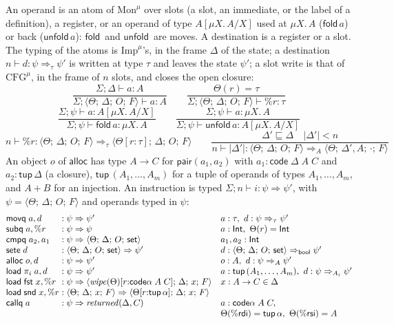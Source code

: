 \documentclass[10pt]{article}
\theoremstyle{acmplain}
\newcommand{\key}[1]{\mathsf{#1}}
\newcommand{\rdi}{\%\key{rdi}}
\newcommand{\rsi}{\%\key{rsi}}
\newcommand{\Tst}[4]{\langle #1;\, #2;\, #3;\, #4 \rangle} %
\newcommand{\tupA}{\key{tup}\,\alpha}                     %
\newcommand{\Treturned}[1]{\mathit{returned}(#1)}
\newcommand{\Twipe}[1]{\mathit{wipe}(#1)}
\newcommand{\Tset}{\key{set}}
\newcommand{\Ml}[1]{\textrm{#1}^{\mu}}                  %
\newcommand{\Mmu}[2]{\mu #1.\,#2}                         %
\newcommand{\Mtup}[1]{\key{tup}\,#1}                      %
\newcommand{\Mcodety}[3]{\key{code}\;#1\;#2\;#3}          %
\newcommand{\Munroll}[2]{#2[\mu #1.\,#2/#1]}              %
\newcommand{\Mbool}{\key{bool}}                           %
\newcommand{\Mfold}{\key{fold}\,}
\newcommand{\Munfold}{\key{unfold}\,}
\newcommand{\codeAB}[2]{\key{code}\alpha\;#1\;#2}         %
\begin{document}
An operand is an atom of $\Ml{Mon}$ over slots (a slot, an immediate, or
the label of a definition), a register, or an operand of type
$\Munroll{X}{A}$ used at $\Mmu{X}{A}$ ($\Mfold a$) or back
($\Munfold a$): $\Mfold$ and $\Munfold$ are moves. A
destination is a register or a slot. The typing of the atoms is
$\Ml{Imp}$'s, in the frame $\Delta$ of the state; a destination
$n \vdash d : \psi \Rightarrow_\tau \psi'$ is written at type $\tau$ and
leaves the state $\psi'$; a slot write is that of $\Ml{CFG}$, in the frame
of $n$ slots, and closes the open closure:
\[
  \frac{\Sigma; \Delta \vdash a : A}{\Sigma; \Tst{\Theta}{\Delta}{O}{F} \vdash a : A}
  \qquad
  \frac{\Theta(r) = \tau}{\Sigma; \Tst{\Theta}{\Delta}{O}{F} \vdash \%r : \tau}
\]
\[
  \frac{\Sigma; \psi \vdash a : \Munroll{X}{A}}{\Sigma; \psi \vdash \Mfold a : \Mmu{X}{A}}
  \qquad
  \frac{\Sigma; \psi \vdash a : \Mmu{X}{A}}{\Sigma; \psi \vdash \Munfold a : \Munroll{X}{A}}
\]
\[
  n \vdash \%r : \Tst{\Theta}{\Delta}{O}{F} \Rightarrow_\tau \Tst{\Theta[r{:}\tau]}{\Delta}{O}{F}
  \qquad
  \frac{\Delta' \sqsubseteq \Delta \quad |\Delta'| < n}
       {n \vdash |\Delta'| : \Tst{\Theta}{\Delta}{O}{F} \Rightarrow_A \Tst{\Theta}{\Delta', A}{\cdot}{F}}
\]
An object $o$ of $\key{alloc}$ has type $A \rightarrow C$ for
$\key{pair}(a_1, a_2)$ with $a_1 : \Mcodety{\Delta}{A}{C}$ and
$a_2 : \Mtup{\Delta}$ (a closure), $\Mtup{(A_1, \ldots, A_m)}$ for a tuple of
operands of types $A_1, \ldots, A_m$, and $A + B$ for an injection. An
instruction is typed $\Sigma; n \vdash i : \psi \Rightarrow \psi'$, with
$\psi = \Tst{\Theta}{\Delta}{O}{F}$ and operands typed in $\psi$:
\[
\begin{array}{@{}l@{\;:\;}l@{\quad}l@{}}
  \key{movq}\; a, d & \psi \Rightarrow \psi' & a : \tau,\ d : \psi \Rightarrow_\tau \psi' \\
  \key{subq}\; a, \%r & \psi \Rightarrow \psi & a : \key{Int},\ \Theta(r) = \key{Int} \\
  \key{cmpq}\; a_2, a_1 & \psi \Rightarrow \Tst{\Theta}{\Delta}{O}{\Tset} & a_1, a_2 : \key{Int} \\
  \key{sete}\; d & \Tst{\Theta}{\Delta}{O}{\Tset} \Rightarrow \psi' & d : \Tst{\Theta}{\Delta}{O}{\Tset} \Rightarrow_{\Mbool} \psi' \\
  \key{alloc}\; o, d & \psi \Rightarrow \psi' & o : A,\ d : \psi \Rightarrow_A \psi' \\
  \key{load}\; \pi_i\; a, d & \psi \Rightarrow \psi' & a : \Mtup{(A_1, \ldots, A_m)},\ d : \psi \Rightarrow_{A_i} \psi' \\
  \key{load}\; \key{fst}\; x, \%r & \psi \Rightarrow \Tst{\Twipe{\Theta}[r{:}\codeAB{A}{C}]}{\Delta}{x}{F} & x : A \rightarrow C \in \Delta \\
  \key{load}\; \key{snd}\; x, \%r & \Tst{\Theta}{\Delta}{x}{F} \Rightarrow \Tst{\Theta[r{:}\tupA]}{\Delta}{x}{F} & \\
  \key{callq}\; a & \psi \Rightarrow \Treturned{\Delta, C} & a : \codeAB{A}{C}, \\
  \multicolumn{2}{l}{} & \Theta(\rdi) = \tupA,\ \Theta(\rsi) = A
\end{array}
\]
\end{document}

